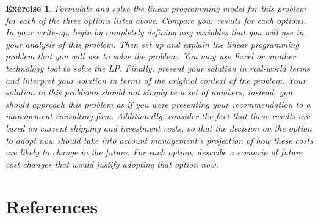\documentclass[letterpaper,10pt]{article}
\newtheorem{ex}{Exercise}
\begin{document}
\begin{ex}
Formulate and solve the linear programming model for this problem for each of the three options listed above.  Compare your results for each options. In your write-up, begin by completely defining any variables that you will use in your analysis of this problem.  Then set up and explain the linear programming problem that you will use to solve the problem.  You may use Excel or another technology tool to solve the LP.  Finally, present your solution in real-world terms and interpret your solution in terms of the original context of the problem.  Your solution to this problemn should not simply be a set of numbers; instead, you should approach this problem as if you were presenting your recommendation to a management consulting firm.  Additionally, consider the fact that these results are based on current shipping and investment costs, so that the decision on the option to adopt now should take into account management’s projection of how these costs are likely to change in the future. For each option, describe a scenario of future cost changes that would justify adopting that option now.
\end{ex}



\newpage

\section{References}
\end{document}
